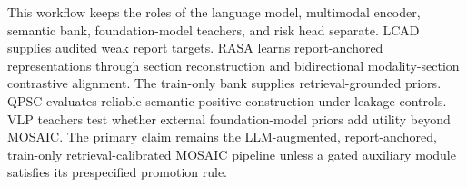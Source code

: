 This workflow keeps the roles of the language model, multimodal encoder, semantic bank, foundation-model teachers, and risk head separate. LCAD supplies audited weak report targets. RASA learns report-anchored representations through section reconstruction and bidirectional modality-section contrastive alignment. The train-only bank supplies retrieval-grounded priors. QPSC evaluates reliable semantic-positive construction under leakage controls. VLP teachers test whether external foundation-model priors add utility beyond MOSAIC. The primary claim remains the LLM-augmented, report-anchored, train-only retrieval-calibrated MOSAIC pipeline unless a gated auxiliary module satisfies its prespecified promotion rule.
